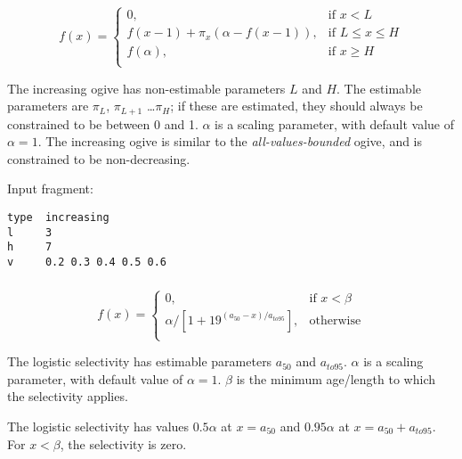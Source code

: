 \begin{equation}
f(x)=\begin{cases}
	  0, & \text{if $x < L$} \\
	  f(x-1)+ \pi_x(\alpha-f(x-1)), & \text{if $L \le x \le H$} \\
	  f(\alpha), & \text{if $x \ge H$} \\
  \end{cases}
\end{equation}

The increasing ogive has non-estimable parameters $L$ and $H$. The estimable parameters are $\pi_L$, $\pi_{L+1}$ \ldots $\pi_H$; if these are estimated, they should always be constrained to be between 0 and 1. $\alpha$ is a scaling parameter, with default value of $\alpha = 1$. The increasing ogive is similar to the \textit{all-values-bounded} ogive, and is constrained to be non-decreasing.

Input fragment: {\small{\begin{verbatim}
type  increasing
l     3
h     7
v     0.2 0.3 0.4 0.5 0.6

\end{verbatim}}}
\subsubsection[Logistic]{}\label{sec:Selectivity-Logistic}

\begin{equation}
  f(x) = \begin{cases}
  	0, & \text{if $x < \beta$} \\
   \alpha / [1+19^{(a_{50}-x)/a_{to95}}], & \text{otherwise} \\
   \end{cases}
\end{equation}

The logistic selectivity has estimable parameters $a_{50}$ and $a_{to95}$. $\alpha$ is a scaling parameter, with default value of $\alpha = 1$. $\beta$ is the minimum age/length to which the selectivity applies. 

The logistic selectivity has values $0.5 \alpha$ at $x=a_{50}$ and $0.95 \alpha$ at $x=a_{50}+a_{to95}$. For $x < \beta$, the selectivity is zero.

\subsubsection[Inverse logistic]{}\label{sec:Selectivity-InverseLogistic} 

